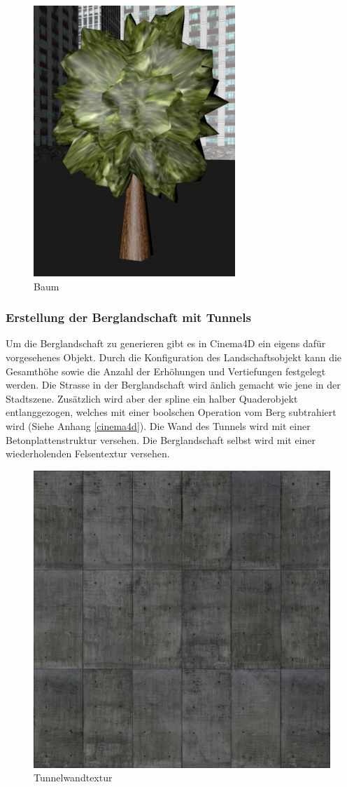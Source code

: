 \begin{figure}[H]
\centering 
\includegraphics[scale=0.4]{src/screenshot_tree.png}
\caption{Baum} %
\label{screenshot_tree} %
\end{figure}

\subsubsection{Erstellung der Berglandschaft mit Tunnels}
Um die Berglandschaft zu generieren gibt es in Cinema4D ein eigens dafür vorgesehenes Objekt. Durch die Konfiguration des Landschaftsobjekt kann die Gesamthöhe sowie die Anzahl der Erhöhungen und Vertiefungen festgelegt werden. Die Strasse in der Berglandschaft wird änlich gemacht wie jene in der Stadtszene. Zusätzlich wird aber der \gls{spline} ein halber Quaderobjekt entlanggezogen, welches mit einer boolschen Operation vom Berg subtrahiert wird (Siehe Anhang \ref{cinema4d}). Die Wand des Tunnels wird mit einer Betonplattenstruktur versehen. Die Berglandschaft selbst wird mit einer wiederholenden Felsentextur versehen.

\begin{figure}[htbp]
\centering 
\includegraphics[width=0.4\linewidth]{src/texture_concretetiles.png}
\caption{Tunnelwandtextur} %
\label{texture_concretetiles} %
\end{figure}

